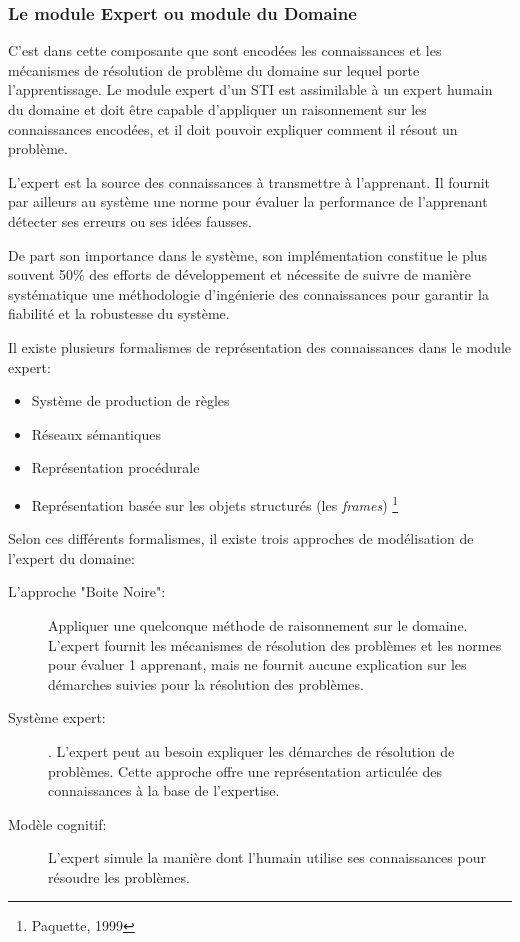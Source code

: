 \newpage

\subsubsection{Le module Expert ou module du Domaine}
C'est dans cette composante que sont encodées les connaissances et les mécanismes de résolution de problème du domaine sur lequel porte l'apprentissage. Le module expert d'un STI est assimilable à un expert humain du domaine et doit être capable d'appliquer un raisonnement sur les connaissances encodées, et il doit pouvoir expliquer comment il résout un problème.

L'expert est la source des connaissances à transmettre à l'apprenant. Il fournit par ailleurs au système une norme pour évaluer la performance de l'apprenant détecter ses erreurs ou ses idées fausses.

De part son importance dans le système, son implémentation constitue le plus souvent 50\% des efforts de développement et nécessite de suivre de manière systématique une méthodologie d'ingénierie des connaissances pour garantir la fiabilité et la robustesse du système.

Il existe plusieurs formalismes de représentation des connaissances dans le module expert:
\begin{itemize}
    \item Système de production de règles
    \item Réseaux sémantiques
    \item Représentation procédurale
    \item Représentation basée sur les objets structurés (les \textit{frames}) \footnote{Paquette, 1999}
\end{itemize}

Selon ces différents formalismes, il existe trois approches de modélisation de l'expert du domaine:

\begin{description}
    \item[L'approche "Boite Noire":] Appliquer une quelconque méthode de raisonnement sur le domaine. L'expert fournit les mécanismes de résolution des problèmes et les normes pour évaluer 1 apprenant, mais ne fournit aucune explication sur les démarches suivies pour la résolution des problèmes.
    \item[Système expert:] . L'expert peut au besoin expliquer les démarches de résolution de problèmes. Cette approche offre une représentation articulée des connaissances à la base de l'expertise. 
    \item[Modèle cognitif:] L'expert simule la manière dont l'humain utilise ses connaissances pour résoudre les problèmes.
\end{description}

